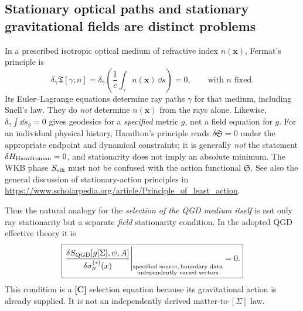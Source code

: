 \documentclass[11pt,a4paper]{article}
\begin{document}
\subsection{Stationary optical paths and stationary gravitational fields are distinct problems}
In a prescribed isotropic optical medium of refractive index $n(\bm x)$, Fermat's principle is
\begin{equation}\label{eq:qm010-fermat}
\delta_{\gamma}\mathfrak T[\gamma;n]
=\delta_{\gamma}\left(\frac1c\int_{\gamma} n(\bm x)\,\dd s\right)=0,
\qquad\text{with $n$ fixed}.\end{equation}
Its Euler--Lagrange equations determine ray paths $\gamma$ for that medium, including Snell's law. They do \emph{not} determine $n(\bm x)$ from the rays alone. Likewise, $\delta_\gamma\int\dd s_g=0$ gives geodesics for a \emph{specified} metric $g$, not a field equation for $g$. For an individual physical history, Hamilton's principle reads $\delta\mathfrak S=0$ under the appropriate endpoint and dynamical constraints; it is generally \emph{not} the statement $\delta H_{\rm Hamiltonian}=0$, and stationarity does not imply an absolute minimum. The WKB phase $S_{\rm eik}$ must not be confused with the action functional $\mathfrak S$. See also the general discussion of stationary-action principles in \url{https://www.scholarpedia.org/article/Principle_of_least_action}.

Thus the natural analogy for the \emph{selection of the QGD medium itself} is not only ray stationarity but a separate \emph{field} stationarity condition. In the adopted QGD effective theory it is
\begin{equation}\label{eq:qm010-field-selection}
\boxed{\left.\frac{\delta S_{\rm QGD}[g[\Sigma],\psi,A]}{\delta\sigma^{(s)}_\mu(x)}\right|_{\substack{\text{specified source},\,\text{boundary data}\\\text{independently varied sectors}}}=0.}\end{equation}
This condition is a \textbf{[C]} selection equation because its gravitational action is already supplied. It is not an independently derived matter-to-$[\Sigma]$ law.
\end{document}
